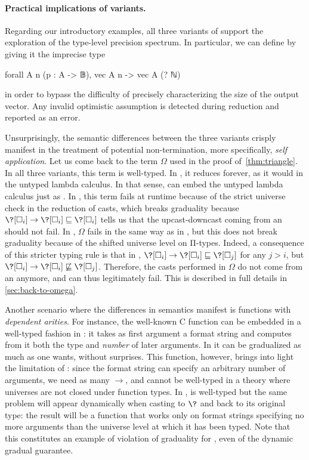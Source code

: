 \paragraph{Practical implications of  variants.}
Regarding our introductory examples, all three variants of 
support the exploration of the type-level precision spectrum.
In particular, we can define  by giving it the imprecise type
\begin{coqcode}
  forall A n (p : A -> 𝔹), vec A n -> vec A (? ℕ)
\end{coqcode}
in order to bypass the difficulty of precisely characterizing the size of the output vector.
Any invalid optimistic assumption is detected during reduction and reported as an error.

Unsurprisingly, the semantic differences between the three  variants crisply manifest in the treatment of potential non-termination, more specifically, \emph{self application}.
%
Let us come back to the term $\Omega$
used in the proof of~\cref{thm:triangle}.
In all three variants, this term is well-typed. In , it
reduces forever, as it would in the untyped lambda calculus. In that
sense,  can embed the untyped lambda calculus just as
 . In , this term fails at runtime
because of the strict universe check in the reduction of casts, which
breaks graduality because $\?[\uni[i]] \to \?[\uni[i]] \pre \?[\uni[i]]$
tells us that the upcast-downcast coming from an  should not fail.
%
In , $\Omega$ fails in the same way as in , but this
does not break graduality because of the shifted universe level on Π-types.
%
Indeed, a consequence of this stricter typing rule is that in ,
$\?[\uni[i]] \to \?[\uni[i]] \pre \?[\uni[j]]$
for any $j > i$, but $\?[\uni[i]] \to \?[\uni[i]] \npre \?[\uni[j]]$.
Therefore, the casts performed in $\Omega$ do not come from an 
anymore, and can thus legitimately fail.
%
This is described in full details in \cref{sec:back-to-omega}.

Another scenario where the differences in semantics manifest is functions with
\emph{dependent arities}.
For instance, the well-known C function \printf{} can be embedded in a well-typed fashion in
: it takes as first argument a format string and computes from it both
the type and \emph{number} of later arguments.
In  it can be gradualized as much as one wants, without surprises.
%
This function, however, brings into light the limitation of :
since the format string can specify an arbitrary number of arguments,
we need as many $\to$, and \printf{} cannot be well-typed
in a theory where universes are not closed under function types.
%
In , \printf{} is well-typed but the same problem will appear dynamically
when casting \printf{} to $\?$ and back to its original type: the result will be
a function that works only on format strings specifying no more arguments than
the universe level at which it has been typed.
%
Note that this constitutes an example of violation of graduality for
, even of the dynamic gradual guarantee.

